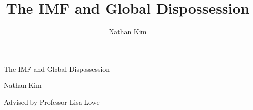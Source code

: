 \title{\Huge The IMF and Global Dispossession}
\author{Nathan Kim}

\begin{titlepage}
  \vspace*{\fill}
  \begin{center}
    
    \begin{Huge}
      The IMF and Global Dispossession
    \end{Huge}

    \begin{large}
      Nathan Kim

      Advised by Professor Lisa Lowe
    \end{large}
  \end{center}

  \vspace{5cm}
  \vspace*{\fill}
\end{titlepage}

\tableofcontents
{}
\clearpage

\setcounter{page}{1}
